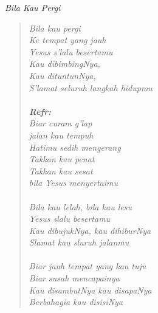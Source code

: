 \small
\begin{center}
\itshape{Bila Kau Pergi}
\end{center}
\begin{verse}
	\itshape{
Bila kau pergi\\
Ke tempat yang jauh\\
Yesus s'lalu besertamu\\
Kau dibimbingNya,\\
Kau dituntunNya,\\
S'lamat seluruh langkah hidupmu\\
{~}\\
\textbf{Refr:}\\
Biar curam g'lap\\
jalan kau tempuh\\
Hatimu sedih mengerang\\
Takkan kau penat\\
Takkan kau sesat\\
bila Yesus menyertaimu\\
{~}\\
Bila kau lelah, bila kau lesu\\
Yesus slalu besertamu\\
Kau dibujukNya, kau dihiburNya\\
Slamat kau sluruh jalanmu\\
{~}\\
Biar jauh tempat yang kau tuju\\
Biar susah mencapainya\\
Kau disambutNya kau disapaNya\\
Berbahagia kau disisiNya
}
\end{verse}
\normalsize